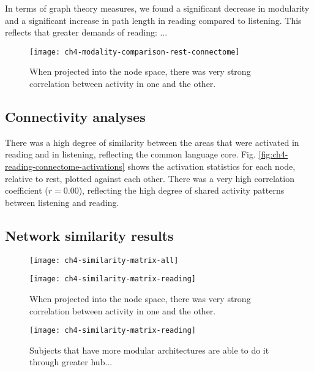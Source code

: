 In terms of graph theory measures, we found a significant decrease in modularity and a significant increase in path length in reading compared to listening. This reflects that greater demands of reading: ...  

\begin{figure}[t]
	\centering
	\texttt{[image: ch4-modality-comparison-rest-connectome]}
    \caption[Large overlap between listening and reading activation in the connectome space.]{When projected into the node space, there was very strong correlation between activity in one and the other.}
	\label{fig:ch4-modality-comparison-rest-connectome}
\end{figure}

\subsection{Connectivity analyses}
There was a high degree of similarity between the areas that were activated in reading and in listening, reflecting the common language core. Fig. \ref{fig:ch4-reading-connectome-activations} shows the activation statistics for each node, relative to rest, plotted against each other. There was a very high correlation coefficient ($r = 0.00$), reflecting the high degree of shared activity patterns between listening and reading.


\subsection{Network similarity results}



\begin{figure}[t]
	\centering
	\texttt{[image: ch4-similarity-matrix-all]}
    \caption[Auditory network organization is more similar for all subjects than it is for reading.]{}
	\label{fig:ch4-modality-network-similarity}
\end{figure}

\begin{figure}[t]
	\centering
	\texttt{[image: ch4-similarity-matrix-reading]}
    \caption[Network similarity between listening and reading predicts word efficiency.]{When projected into the node space, there was very strong correlation between activity in one and the other.}
	\label{fig:ch4-modality-network-similarity}
\end{figure}


\begin{figure}[t]
	\centering
	\texttt{[image: ch4-similarity-matrix-reading]}
    \caption[Diversity of between-network connections predominates on .... ]{Subjects that have more modular architectures are able to do it through greater hub... }
	\label{fig:ch4-modality-network-similarity}
\end{figure}



